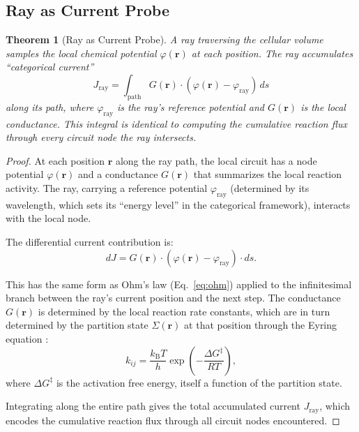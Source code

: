 \documentclass[11pt,twocolumn,a4paper]{article}
\newtheorem{theorem}{Theorem}[section]
\newcommand{\kb}{k_{\mathrm{B}}}
\newcommand{\Jray}{J_{\mathrm{ray}}}
\begin{document}
\subsection{Ray as Current Probe}

\begin{theorem}[Ray as Current Probe]
\label{thm:ray-current}
A ray traversing the cellular volume samples the local chemical
potential $\varphi(\mathbf{r})$ at each position. The ray accumulates
``categorical current''
\begin{equation}
\Jray = \int_{\mathrm{path}} G(\mathbf{r}) \cdot
  (\varphi(\mathbf{r}) - \varphi_{\mathrm{ray}}) \, ds
\label{eq:ray-current}
\end{equation}
along its path, where $\varphi_{\mathrm{ray}}$ is the ray's reference
potential and $G(\mathbf{r})$ is the local conductance. This integral
is identical to computing the cumulative reaction flux through every
circuit node the ray intersects.
\end{theorem}

\begin{proof}
At each position $\mathbf{r}$ along the ray path, the local circuit
has a node potential $\varphi(\mathbf{r})$ and a conductance
$G(\mathbf{r})$ that summarizes the local reaction activity. The ray,
carrying a reference potential $\varphi_{\mathrm{ray}}$ (determined by
its wavelength, which sets its ``energy level'' in the categorical
framework), interacts with the local node.

The differential current contribution is:
\begin{equation}
dJ = G(\mathbf{r}) \cdot (\varphi(\mathbf{r}) -
  \varphi_{\mathrm{ray}}) \cdot ds.
\label{eq:dj}
\end{equation}

This has the same form as Ohm's law
(Eq.~\eqref{eq:ohm}) applied to the infinitesimal branch between the
ray's current position and the next step. The conductance
$G(\mathbf{r})$ is determined by the local reaction rate constants,
which are in turn determined by the partition state $\Sigma(\mathbf{r})$
at that position through the Eyring equation
\citep{eyring1935}:
\begin{equation}
k_{ij} = \frac{\kb T}{h} \exp\!\left(-\frac{\Delta G^\ddagger}{RT}\right),
\label{eq:eyring}
\end{equation}
where $\Delta G^\ddagger$ is the activation free energy, itself a
function of the partition state.

Integrating along the entire path gives the total accumulated
current $\Jray$, which encodes the cumulative reaction flux through
all circuit nodes encountered.
\end{proof}
\end{document}
